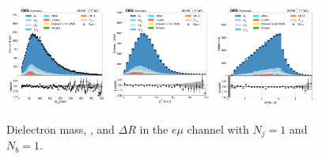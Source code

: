 \begin{figure}[htb!]
    \centering
    \includegraphics[width=0.3\textwidth]{chapters/Appendix/sectionPlots/figures/data_mc_overlays/emu_2016_cat_eq1_eq1_a_signal_linear_lepton_dilepton1_mass}
    \includegraphics[width=0.3\textwidth]{chapters/Appendix/sectionPlots/figures/data_mc_overlays/emu_2016_cat_eq1_eq1_a_signal_linear_lepton_dilepton1_pt}
    \includegraphics[width=0.3\textwidth]{chapters/Appendix/sectionPlots/figures/data_mc_overlays/emu_2016_cat_eq1_eq1_a_signal_linear_lepton_dilepton1_delta_r}
    \caption{Dielectron mass, \pt, and $\Delta R$ in the $e\mu$ channel
    with $N_{j} = 1$ and $N_{b} = 1$.}
    \label{fig:emu_3_dilepton}
\end{figure}

